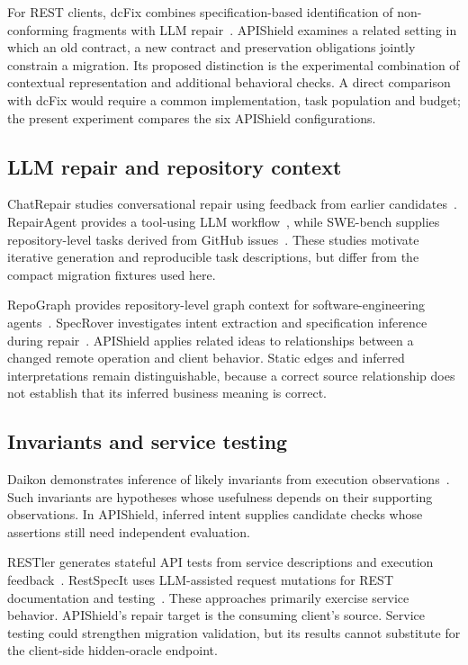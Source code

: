 For REST clients, dcFix combines specification-based identification of non-conforming fragments with LLM repair~\cite{dcfix2025}. APIShield examines a related setting in which an old contract, a new contract and preservation obligations jointly constrain a migration. Its proposed distinction is the experimental combination of contextual representation and additional behavioral checks. A direct comparison with dcFix would require a common implementation, task population and budget; the present experiment compares the six APIShield configurations.

\subsection{LLM repair and repository context}
ChatRepair studies conversational repair using feedback from earlier candidates~\cite{chatrepair2024}. RepairAgent provides a tool-using LLM workflow~\cite{repairagent2024}, while SWE-bench supplies repository-level tasks derived from GitHub issues~\cite{swebench2024}. These studies motivate iterative generation and reproducible task descriptions, but differ from the compact migration fixtures used here.

RepoGraph provides repository-level graph context for software-engineering agents~\cite{repograph2025}. SpecRover investigates intent extraction and specification inference during repair~\cite{specrover2024}. APIShield applies related ideas to relationships between a changed remote operation and client behavior. Static edges and inferred interpretations remain distinguishable, because a correct source relationship does not establish that its inferred business meaning is correct.

\subsection{Invariants and service testing}
Daikon demonstrates inference of likely invariants from execution observations~\cite{daikon2007}. Such invariants are hypotheses whose usefulness depends on their supporting observations. In APIShield, inferred intent supplies candidate checks whose assertions still need independent evaluation.

RESTler generates stateful API tests from service descriptions and execution feedback~\cite{restler2019}. RestSpecIt uses LLM-assisted request mutations for REST documentation and testing~\cite{restspecit2025}. These approaches primarily exercise service behavior. APIShield's repair target is the consuming client's source. Service testing could strengthen migration validation, but its results cannot substitute for the client-side hidden-oracle endpoint.

